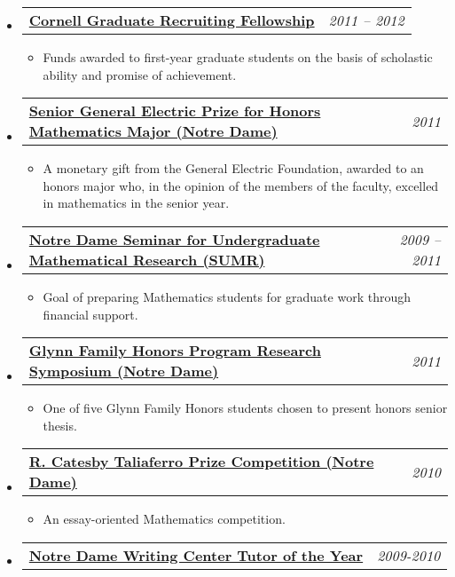 \documentclass[letterpaper,11pt]{article}
\makeatletter
\newcommand{\resitem}[1]{\item #1 \vspace{-2pt}}
\newenvironment{widetable}[1]
	       {\begin{tabular*}{#1}[t]{l@{\extracolsep{\fill}}r}}
	       {\end{tabular*}}
\newcommand{\resitemdate}[2]{
  \begin{widetable}{\textwidth - 28pt}
		\textbf{#1} & #2 \\
  \end{widetable}
  \vspace{-18pt}}
\makeatother
\begin{document}
\begin{itemize}
\item
  \resitemdate{\href{http://www.math.cornell.edu/Graduate/Funds/fellowships.html}{Cornell Graduate Recruiting Fellowship}}{\emph{2011 -- 2012}}
\begin{itemize}
\resitem {Funds awarded to first-year graduate students on the basis of scholastic ability and promise of achievement.}
\end{itemize} 
\item
  \resitemdate{\href{http://math.nd.edu/awards-and-recognition/undergraduate-awards/undergraduate-awards-2011/}{Senior General Electric Prize for Honors Mathematics Major (Notre Dame)}}{\emph{2011}}
\begin{itemize}
\resitem {A monetary gift from the General Electric Foundation, awarded to an honors major who, in the opinion of the members of the faculty, excelled in mathematics in the senior year.}
\end{itemize} 
\item \resitemdate{\href{http://nd.edu/~sumr/}{Notre Dame Seminar for Undergraduate Mathematical Research (SUMR)}}{\emph{2009 -- 2011}}
\begin{itemize} 
\resitem {Goal of preparing Mathematics students for graduate work through financial support.}
\end{itemize}
\item \resitemdate{\href{http://glynnhonors.nd.edu/beyond/final-symposium/index.shtml}{Glynn Family Honors Program Research Symposium (Notre Dame)}}{\emph{2011}}
\begin{itemize} 
\resitem {One of five Glynn Family Honors students chosen to present honors senior thesis.}
\end{itemize}

\item \resitemdate{\href{http://math.nd.edu/awards-and-recognition/undergraduate-awards/undergraduate-awards-2010/}{R. Catesby Taliaferro Prize Competition (Notre Dame)}}{\emph{2010}}
\begin{itemize} 
\resitem {An essay-oriented Mathematics competition.}
\end{itemize}

\item \resitemdate{\href{http://math.nd.edu/awards-and-recognition/undergraduate-awards/undergraduate-awards-2010/}{Notre Dame Writing Center Tutor of the Year}}{\emph{2009-2010}}

\end{itemize}
\end{document}
